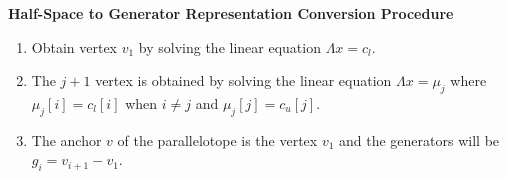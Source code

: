 \begin{tcolorbox}
\centering \textbf{Half-Space to Generator Representation Conversion Procedure}
\begin{enumerate}

  \item Obtain vertex $v_1$ by solving the linear equation $\Lambda x = c_{l}$.
  \item The $j+1$ vertex is obtained by solving the linear equation $\Lambda x = \mu_{j}$ where $\mu_{j}[i] = c_{l}[i]$ when $i \neq j$ and $\mu_{j}[j] = c_{u}[j]$.
  \item The anchor $v$ of the parallelotope is the vertex $v_1$ and the generators will be $g_{i} = v_{i+1} - v_{1}$.
\end{enumerate}
\end{tcolorbox}
